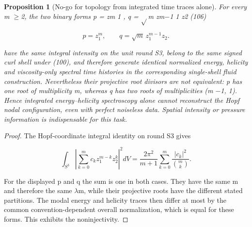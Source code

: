 \documentclass[10pt,letterpaper]{article}
\newtheorem{proposition}[theorem]{Proposition}
\theoremstyle{remark}
\begin{document}
\begin{proposition}[No-go for topology from integrated time traces alone]

For every m \(\ge \)2, the two binary forms p = zm 1 , q = \(\sqrt{} \)m zm\(- \)1 1 z2 (106)


\begin{equation}
\tag{106}\label{eq:106}
p=z_1^m,\qquad q=\sqrt m\,z_1^{m-1}z_2.
\end{equation}

have the same integral intensity on the unit round S3, belong to the same signed curl shell under (100), and therefore generate identical normalized energy, helicity and viscosity-only spectral time histories in the corresponding single-shell fluid construction. Nevertheless their projective root divisors are not equivalent: p has one root of multiplicity m, whereas q has two roots of multiplicities (m \(- \)1, 1). Hence integrated energy–helicity spectroscopy alone cannot reconstruct the Hopf nodal configuration, even with perfect noiseless data. Spatial intensity or pressure information is indispensable for this task.


\end{proposition}

\begin{proof}
The Hopf-coordinate integral identity on round S3 gives


\begin{equation}
\tag{107}\label{eq:107}
\int_{S^3}\left|\sum_{k=0}^mc_kz_1^{m-k}z_2^k\right|^2dV=\frac{2\pi^2}{m+1}\sum_{k=0}^m\frac{|c_k|^2}{\binom mk}.
\end{equation}

For the displayed p and q the sum is one in both cases. They have the same m and therefore the same \(\lambda \)m, while their projective roots have the different stated partitions. The modal energy and helicity traces then differ at most by the common convention-dependent overall normalization, which is equal for these forms. This exhibits the noninjectivity.


\end{proof}
\end{document}
